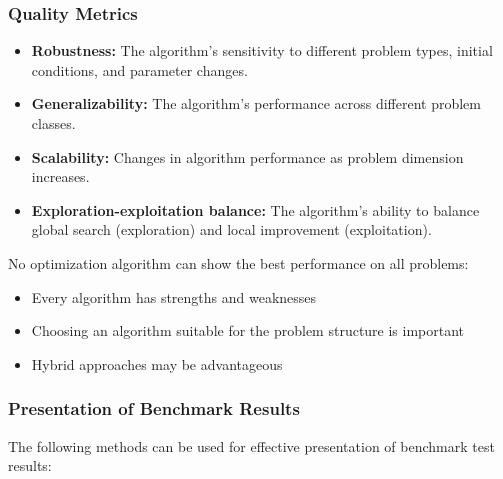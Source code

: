\subsubsection{Quality Metrics}

\begin{itemize}
    \item \textbf{Robustness:} The algorithm's sensitivity to different problem types, initial conditions, and parameter changes.
    
    \item \textbf{Generalizability:} The algorithm's performance across different problem classes.
    
    \item \textbf{Scalability:} Changes in algorithm performance as problem dimension increases.
    
    \item \textbf{Exploration-exploitation balance:} The algorithm's ability to balance global search (exploration) and local improvement (exploitation).
\end{itemize}


\begin{tcolorbox}[title=No Free Lunch Theorem]
No optimization algorithm can show the best performance on all problems:
\begin{itemize}
    \item Every algorithm has strengths and weaknesses
    \item Choosing an algorithm suitable for the problem structure is important
    \item Hybrid approaches may be advantageous
\end{itemize}
\end{tcolorbox}

\subsubsection{Presentation of Benchmark Results}

The following methods can be used for effective presentation of benchmark test results:

